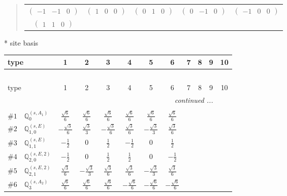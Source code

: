 \documentclass[fleqn,9pt,landscape]{jsarticle}
\begin{document}
\begin{quote}
\begin{tabular}{ccccc}
$ \begin{pmatrix} -1 & -1 & 0 \end{pmatrix} $ & $ \begin{pmatrix} 1 & 0 & 0 \end{pmatrix} $ & $ \begin{pmatrix} 0 & 1 & 0 \end{pmatrix} $ & $ \begin{pmatrix} 0 & -1 & 0 \end{pmatrix} $ & $ \begin{pmatrix} -1 & 0 & 0 \end{pmatrix} $ \\
$ \begin{pmatrix} 1 & 1 & 0 \end{pmatrix} $ & $  $ & $  $ & $  $ & $  $
\end{tabular}
\end{quote}
* site basis
\begin{center}
\renewcommand{\arraystretch}{1.3}
\begin{longtable}{lcccccccccc}
 \hline \hline
type & 1 & 2 & 3 & 4 & 5 & 6 & 7 & 8 & 9 & 10 \\ \hline \endfirsthead

\multicolumn{10}{l}{\tablename\ \thetable{}} \\
 \hline \hline
type & 1 & 2 & 3 & 4 & 5 & 6 & 7 & 8 & 9 & 10 \\ \hline \endhead

 \hline \hline
\multicolumn{10}{r}{\footnotesize\it continued ...} \\ \endfoot

 \hline \hline
\multicolumn{10}{r}{} \\ \endlastfoot

$ \#1\quad \mathbb{Q}_{0}^{(s,A_{1})} $ & $ \frac{\sqrt{6}}{6} $ & $ \frac{\sqrt{6}}{6} $ & $ \frac{\sqrt{6}}{6} $ & $ \frac{\sqrt{6}}{6} $ & $ \frac{\sqrt{6}}{6} $ & $ \frac{\sqrt{6}}{6} $ \\ \hline
$ \#2\quad \mathbb{Q}_{1,0}^{(s,E)} $ & $ - \frac{\sqrt{3}}{6} $ & $ \frac{\sqrt{3}}{3} $ & $ - \frac{\sqrt{3}}{6} $ & $ \frac{\sqrt{3}}{6} $ & $ - \frac{\sqrt{3}}{3} $ & $ \frac{\sqrt{3}}{6} $ \\ \hline
$ \#3\quad \mathbb{Q}_{1,1}^{(s,E)} $ & $ - \frac{1}{2} $ & $ 0 $ & $ \frac{1}{2} $ & $ - \frac{1}{2} $ & $ 0 $ & $ \frac{1}{2} $ \\ \hline
$ \#4\quad \mathbb{Q}_{2,0}^{(s,E,2)} $ & $ - \frac{1}{2} $ & $ 0 $ & $ \frac{1}{2} $ & $ \frac{1}{2} $ & $ 0 $ & $ - \frac{1}{2} $ \\ \hline
$ \#5\quad \mathbb{Q}_{2,1}^{(s,E,2)} $ & $ \frac{\sqrt{3}}{6} $ & $ - \frac{\sqrt{3}}{3} $ & $ \frac{\sqrt{3}}{6} $ & $ \frac{\sqrt{3}}{6} $ & $ - \frac{\sqrt{3}}{3} $ & $ \frac{\sqrt{3}}{6} $ \\ \hline
$ \#6\quad \mathbb{Q}_{3}^{(s,A_{2})} $ & $ \frac{\sqrt{6}}{6} $ & $ \frac{\sqrt{6}}{6} $ & $ \frac{\sqrt{6}}{6} $ & $ - \frac{\sqrt{6}}{6} $ & $ - \frac{\sqrt{6}}{6} $ & $ - \frac{\sqrt{6}}{6} $ \\
\end{longtable}
\end{center}
\end{document}
